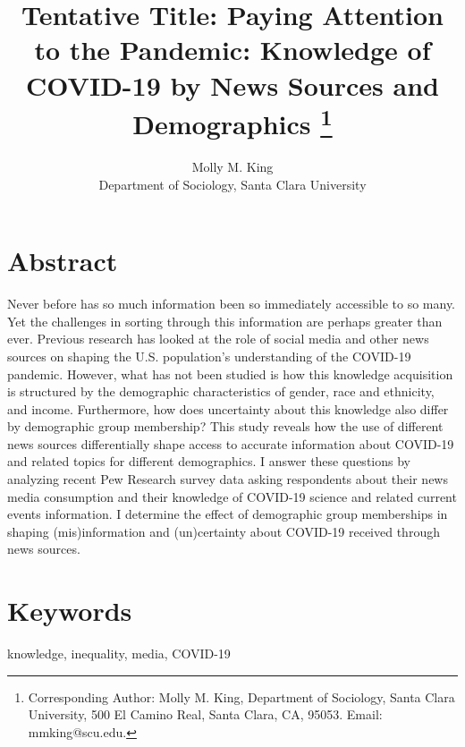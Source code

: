 \documentclass[11pt]{article}
\begin{document}
\title{Tentative Title: Paying Attention to the Pandemic: Knowledge of COVID-19 by News Sources and Demographics
\footnote{Corresponding Author: Molly M. King,
          Department of Sociology, Santa Clara University,
          500 El Camino Real, Santa Clara, CA, 95053.
          Email: mmking@scu.edu.}}

\author{Molly M. King \\ Department of Sociology, Santa Clara University}
\date{}

\clearpage\maketitle

\section{Abstract}\label{sec:abstract}
\pagestyle{fancy} %
\setcounter{page}{1} %

Never before has so much information been so immediately accessible to
so many. Yet the challenges in sorting through this information are perhaps
greater than ever. Previous research has looked at the role of social media and
other news sources on shaping the U.S. population’s understanding of the COVID-19
pandemic. However, what has not been studied is how this knowledge acquisition
is structured by the demographic characteristics of gender, race and ethnicity, and
income. Furthermore, how does uncertainty about this knowledge also differ by
demographic group membership? This study reveals how the use of
different news sources differentially shape access to accurate information about
COVID-19 and related topics for different demographics. I answer these questions
by analyzing recent Pew Research survey data asking respondents about their news
media consumption and their knowledge of COVID-19 science and related current
events information. I determine the effect of demographic group memberships in
shaping (mis)information and (un)certainty about COVID-19 received through news sources.


\section{Keywords}

knowledge, inequality, media, COVID-19
\end{document}
